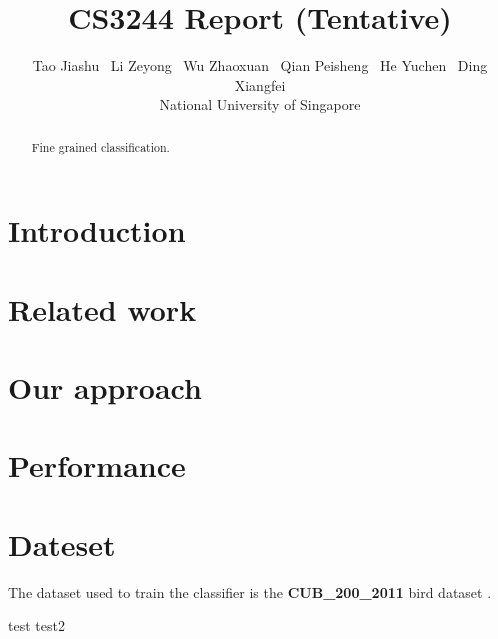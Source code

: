 \documentclass[letterpaper, 12pt]{article}
\title{CS3244 Report (Tentative)}
\author{Tao Jiashu \ Li Zeyong \  Wu Zhaoxuan \ Qian Peisheng \ He Yuchen \ Ding Xiangfei\\
National University of Singapore}
\date{}
\begin{document}
\maketitle

\begin{abstract}
Fine grained classification.
\end{abstract}

\section{Introduction}

\section{Related work}

\section{Our approach}

\section{Performance}

\section{Dateset}
The dataset used to train the classifier is the \textbf{CUB\_200\_2011}
bird dataset \cite{WahCUB_200_2011}.

test\cite{krause2015fine}
test2\cite{10.1007/978-3-319-73603-7_11}


\end{document}
